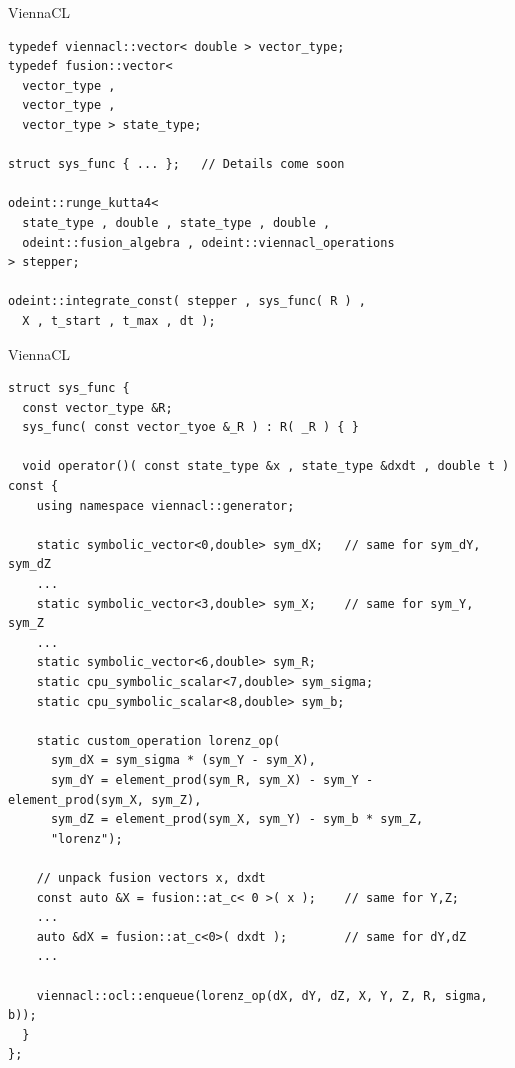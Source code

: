 \documentclass{beamer}
\newcommand{\heading}[1]{\centerline{\Large #1} \vspace{0.5em}}
\begin{document}
\begin{frame}[fragile]
 \heading{ViennaCL}

\begin{lstlisting}[basicstyle=\scriptsize\ttfamily]
typedef viennacl::vector< double > vector_type;
typedef fusion::vector<
  vector_type ,
  vector_type ,
  vector_type > state_type;

struct sys_func { ... };   // Details come soon

odeint::runge_kutta4<
  state_type , double , state_type , double ,
  odeint::fusion_algebra , odeint::viennacl_operations
> stepper;

odeint::integrate_const( stepper , sys_func( R ) ,
  X , t_start , t_max , dt );
\end{lstlisting}

\end{frame}


\begin{frame}[fragile]
 \heading{ViennaCL}

\begin{lstlisting}[basicstyle=\tiny\ttfamily]
struct sys_func {
  const vector_type &R;
  sys_func( const vector_tyoe &_R ) : R( _R ) { }

  void operator()( const state_type &x , state_type &dxdt , double t ) const {
    using namespace viennacl::generator;

    static symbolic_vector<0,double> sym_dX;   // same for sym_dY, sym_dZ
    ... 
    static symbolic_vector<3,double> sym_X;    // same for sym_Y, sym_Z
    ... 
    static symbolic_vector<6,double> sym_R;
    static cpu_symbolic_scalar<7,double> sym_sigma;
    static cpu_symbolic_scalar<8,double> sym_b;

    static custom_operation lorenz_op(
      sym_dX = sym_sigma * (sym_Y - sym_X),
      sym_dY = element_prod(sym_R, sym_X) - sym_Y - element_prod(sym_X, sym_Z),
      sym_dZ = element_prod(sym_X, sym_Y) - sym_b * sym_Z,
      "lorenz");

    // unpack fusion vectors x, dxdt
    const auto &X = fusion::at_c< 0 >( x );    // same for Y,Z;
    ...
    auto &dX = fusion::at_c<0>( dxdt );        // same for dY,dZ
    ...

    viennacl::ocl::enqueue(lorenz_op(dX, dY, dZ, X, Y, Z, R, sigma, b));
  }
};
\end{lstlisting}

\end{frame}
\end{document}
